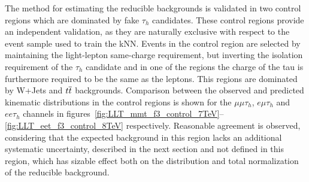 The method for estimating the reducible backgrounds is validated in two control regions which are dominated by fake $\tau_h$ candidates.
These control regions provide an independent validation, as they are naturally exclusive with respect to the event sample used to train the kNN. Events in the control region are selected by maintaining
the light-lepton same-charge requirement, but inverting the isolation requirement of the $\tau_h$ candidate and in one of the regions the charge of the tau is furthermore required to be the same as the leptons.
This regions are dominated by W+Jets and $t\overline{t}$ backgrounds.
Comparison between the observed and predicted kinematic distributions in the control regions is shown for the $\mu\mu\tau_h$, $e\mu\tau_h$ and $ee\tau_h$ channels in figures~\ref{fig:LLT_mmt_f3_control_7TeV}--\ref{fig:LLT_eet_f3_control_8TeV} respectively.
Reasonable agreement is observed, considering that the expected background in this region lacks an additional systematic uncertainty, described in the next section and not defined in this region, which has sizable effect both on the distribution and total normalization of the reducible background.

